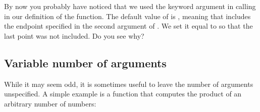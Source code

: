 \documentclass[letterpaper,10pt,english]{sphinxmanual}
\begin{document}
\sphinxAtStartPar
By now you probably have noticed that we used the keyword argument  in calling  in our definition of the  function.  The default value of  is , meaning that  includes the endpoint specified in the second argument of .  We set it equal to  so that the last point was not included.  Do you see why?

\ignorespaces 

\subsection{Variable number of arguments}
\label{\detokenize{chap7/chap7_funcs:variable-number-of-arguments}}\label{\detokenize{chap7/chap7_funcs:index-4}}
\sphinxAtStartPar
While it may seem odd, it is sometimes useful to leave the number of arguments unspecified.  A simple example is a function that computes the product of an arbitrary number of numbers:

\begin{sphinxVerbatim}[commandchars=\\\{\},numbers=left,firstnumber=1,stepnumber=1]
 
      
       
          
     
\end{sphinxVerbatim}

\begin{sphinxVerbatim}[commandchars=\\\{\},numbers=left,firstnumber=1,stepnumber=1]
  

 
\end{sphinxVerbatim}
\end{document}
